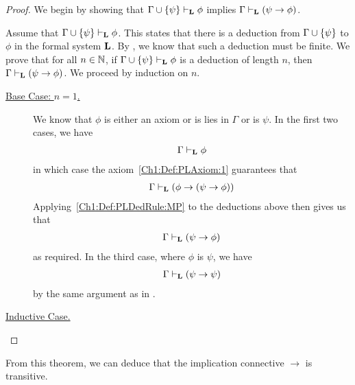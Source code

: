 \begin{proof}
    We begin by showing that $\Gamma \cup \left\{ \psi \right\} \vdash_{\mathbf{L}} \phi$ implies $\Gamma \vdash_{\mathbf{L}} \left( \psi \to \phi \right)$.

    Assume that $\Gamma \cup \left\{ \psi \right\} \vdash_{\mathbf{L}} \phi$. This states that there is a deduction from $\Gamma \cup \left\{ \psi \right\}$ to $\phi$ in the formal system $\mathbf{L}$. By , we know that such a deduction must be finite. We prove that for all $n \in \mathbb{N}$, if $\Gamma \cup \left\{ \psi \right\} \vdash_{\mathbf{L}} \phi$ is a deduction of length $n$, then $\Gamma \vdash_{\mathbf{L}} \left( \psi \to \phi \right)$. We proceed by induction on $n$.

    \begin{description}
        \item[\underline{Base Case: $n = 1$.}]
        We know that $\phi$ is either an axiom or is lies in $\Gamma$ or is $\psi$. In the first two cases, we have
        \begin{align*}
            \Gamma \vdash_{\mathbf{L}} \phi
        \end{align*}
        in which case the axiom~\ref{Ch1:Def:PLAxiom:1} guarantees that
        \begin{align*}
            \Gamma \vdash_{\mathbf{L}} \left( \phi \to \left( \psi \to \phi \right) \right)
        \end{align*}
        Applying~\ref{Ch1:Def:PLDedRule:MP} to the deductions above then gives us that
        \begin{align*}
            \Gamma \vdash_{\mathbf{L}} \left( \psi \to \phi \right)
        \end{align*}
        as required. In the third case, where $\phi$ is $\psi$, we have
        \begin{align*}
            \Gamma \vdash_{\mathbf{L}} \left( \psi \to \psi \right)
        \end{align*}
        by the same argument as in .
    
    \item[\underline{Inductive Case.}] \sorry
    \end{description}
\end{proof}

From this theorem, we can deduce that the implication connective $\to$ is transitive.

